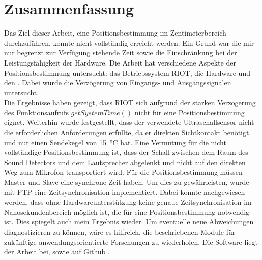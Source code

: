 \newpage
\section{Zusammenfassung}

Das Ziel dieser Arbeit, eine Positionsbestimmung im Zentimeterbereich durchzuführen, konnte nicht vollständig erreicht werden. Ein Grund war die mir nur begrenzt zur Verfügung stehende Zeit sowie die Einschränkung bei der Leistungsfähigkeit der Hardware.
Die Arbeit hat verschiedene Aspekte der Positionsbestimmung untersucht: das Betriebssystem RIOT, die Hardware \microphone \platz und den \ultraschall. Dabei wurde die Verzögerung von Eingangs- und Ausgangssignalen untersucht.
\\
Die Ergebnisse haben gezeigt, dass RIOT sich aufgrund der starken Verzögerung des Funktionsaufrufs $getSystemTime()$ nicht für eine Positionsbestimmung eignet. Weiterhin wurde festgestellt, dass der verwendete Ultraschallsensor nicht die erforderlichen Anforderungen erfüllte, da er direkten Sichtkontakt benötigt und nur einen Sendekegel von \SI{15}{\degreeCelsius} hat. Eine Vermutung für die nicht vollständige Positionsbestimmung ist, dass der Schall zwischen dem Raum des Sound Detectors und dem Lautsprecher abgelenkt und nicht auf den direkten Weg zum Mikrofon transportiert wird. Für die Positionsbestimmung müssen Master und Slave eine synchrone Zeit haben. Um dies zu gewährleisten, wurde mit PTP eine Zeitsynchronisation implementiert. Dabei konnte nachgewiesen werden, dass ohne Hardwareunterstützung keine genaue Zeitsynchronisation im Nanosekundenbereich möglich ist, die für eine Positionsbestimmung notwendig ist. Dies spiegelt auch mein Ergebnis wieder. Um eventuelle neue Abweichungen diagnostizieren zu können, wäre es hilfreich, die beschriebenen Module für zukünftige anwendungsorientierte Forschungen zu wiederholen. Die Software liegt der Arbeit bei, sowie auf Github \cite{src_GITHUB_CODE_BA}\cite{src_genauigkeit_zeit_sync} .

